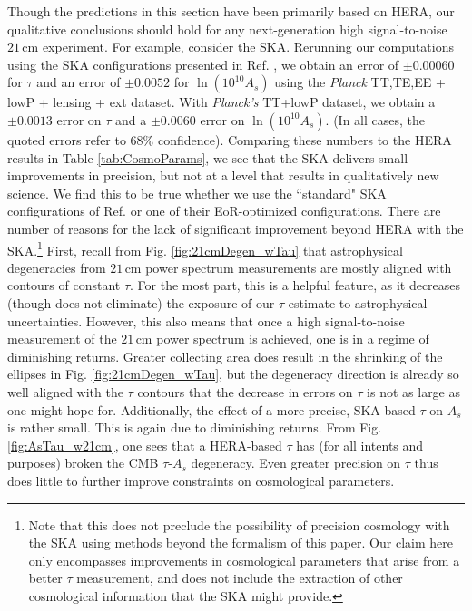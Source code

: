 \documentclass[twocolumn,aps,prd,nofootinbib,showpacs]{revtex4-1}
\begin{document}
Though the predictions in this section have been primarily based on HERA, our qualitative conclusions should hold for any next-generation high signal-to-noise $21\,\textrm{cm}$ experiment. For example, consider the SKA. Rerunning our computations using the SKA configurations presented in Ref. \cite{greig_et_al2015b}, we obtain an error of $\pm 0.00060$ for $\tau$ and an error of $\pm 0.0052$ for $\ln (10^{10} A_s)$ using the \emph{Planck} TT,TE,EE + lowP + lensing + ext dataset. With \emph{Planck's} TT+lowP dataset, we obtain a $\pm 0.0013$ error on $\tau$ and a $\pm 0.0060$ error on $\ln (10^{10} A_s)$. (In all cases, the quoted errors refer to $68\%$ confidence). Comparing these numbers to the HERA results in Table \ref{tab:CosmoParams}, we see that the SKA delivers small improvements in precision, but not at a level that results in qualitatively new science.  We find this to be true whether we use the ``standard" SKA configurations of Ref. \cite{greig_et_al2015b} or one of their EoR-optimized configurations. There are number of reasons for the lack of significant improvement beyond HERA with the SKA.\footnote{Note that this does not preclude the possibility of precision cosmology with the SKA using methods beyond the formalism of this paper. Our claim here only encompasses improvements in cosmological parameters that arise from a better $\tau$ measurement, and does not include the extraction of other cosmological information that the SKA might provide.} First, recall from Fig. \ref{fig:21cmDegen_wTau} that astrophysical degeneracies from $21\,\textrm{cm}$ power spectrum measurements are mostly aligned with contours of constant $\tau$. For the most part, this is a helpful feature, as it decreases (though does not eliminate) the exposure of our $\tau$ estimate to astrophysical uncertainties. However, this also means that once a high signal-to-noise measurement of the $21\,\textrm{cm}$ power spectrum is achieved, one is in a regime of diminishing returns. Greater collecting area does result in the shrinking of the ellipses in Fig. \ref{fig:21cmDegen_wTau}, but the degeneracy direction is already so well aligned with the $\tau$ contours that the decrease in errors on $\tau$ is not as large as one might hope for. Additionally, the effect of a more precise, SKA-based $\tau$ on $A_s$ is rather small. This is again due to diminishing returns. From Fig. \ref{fig:AsTau_w21cm}, one sees that a HERA-based $\tau$ has (for all intents and purposes) broken the CMB $\tau$-$A_s$ degeneracy. Even greater precision on $\tau$ thus does little to further improve constraints on cosmological parameters.
\end{document}
